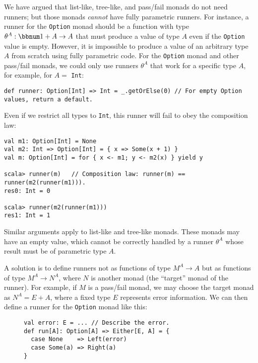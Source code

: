 We have argued that list-like, tree-like, and pass/fail monads do
not need runners; but those monads \emph{cannot} have fully parametric
runners. For instance, a runner for the \lstinline!Option! monad
should be a function with type $\theta^{A}:\bbnum 1+A\rightarrow A$
that must produce a value of type $A$ even if the \lstinline!Option!
value is empty. However, it is impossible to produce a value of an
arbitrary type $A$ from scratch using fully parametric code. For
the \lstinline!Option! monad and other pass/fail monads, we could
only use runners $\theta^{A}$ that work for a specific type $A$,
for example, for $A=$ \lstinline!Int!:
\begin{lstlisting}
def runner: Option[Int] => Int = _.getOrElse(0) // For empty Option values, return a default.
\end{lstlisting}
Even if we restrict all types to \lstinline!Int!, this runner will
fail to obey the composition law:
\begin{lstlisting}
val m1: Option[Int] = None
val m2: Int => Option[Int] = { x => Some(x + 1) }
val m: Option[Int] = for { x <- m1; y <- m2(x) } yield y

scala> runner(m)   // Composition law: runner(m) == runner(m2(runner(m1))).
res0: Int = 0

scala> runner(m2(runner(m1)))
res1: Int = 1
\end{lstlisting}
Similar arguments apply to list-like and tree-like monads. These monads
may have an empty value, which cannot be correctly handled by a runner
$\theta^{A}$ whose result must be of parametric type $A$. 

A solution is to define runners not as functions of type $M^{A}\rightarrow A$
but as functions of type $M^{A}\rightarrow N^{A}$, where $N$ is
another monad (the \textsf{``}target\textsf{''} monad of the runner). For example,
if $M$ is a pass/fail monad, we may choose the target monad as $N^{A}=E+A$,
where a fixed type $E$ represents error information. We can then
define a runner for the \lstinline!Option! monad like this:

\begin{wrapfigure}{l}{0.43\columnwidth}%
\vspace{-0.45\baselineskip}

\begin{lstlisting}
val error: E = ... // Describe the error.
def run[A]: Option[A] => Either[E, A] = {
  case None    => Left(error)
  case Some(a) => Right(a)
}
\end{lstlisting}
\vspace{-2.2\baselineskip}
\end{wrapfigure}%

